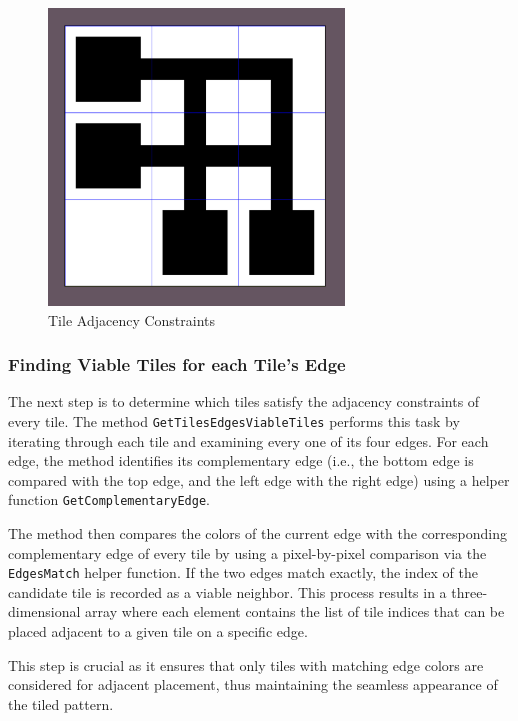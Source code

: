 \documentclass[a4paper, 12pt, one column, aas_macros]{article}
\begin{document}
\begin{figure}[htbp]
  \centering
  \includegraphics[width=0.7\textwidth]{images/wfc-tile-adjacency-constraints.png}
  \caption{Tile Adjacency Constraints}
  \label{fig:wfc-tile-adjacency-constraints}
\end{figure}

\subsubsection{Finding Viable Tiles for each Tile's Edge}
The next step is to determine which tiles satisfy the adjacency constraints of every tile. The method \texttt{GetTilesEdgesViableTiles} performs this task by iterating through each tile and examining every one of its four edges. For each edge, the method identifies its complementary edge (i.e., the bottom edge is compared with the top edge, and the left edge with the right edge) using a helper function \texttt{GetComplementaryEdge}.

The method then compares the colors of the current edge with the corresponding complementary edge of every tile by using a pixel-by-pixel comparison via the \texttt{EdgesMatch} helper function. If the two edges match exactly, the index of the candidate tile is recorded as a viable neighbor. This process results in a three-dimensional array where each element contains the list of tile indices that can be placed adjacent to a given tile on a specific edge.

This step is crucial as it ensures that only tiles with matching edge colors are considered for adjacent placement, thus maintaining the seamless appearance of the tiled pattern.
\end{document}
